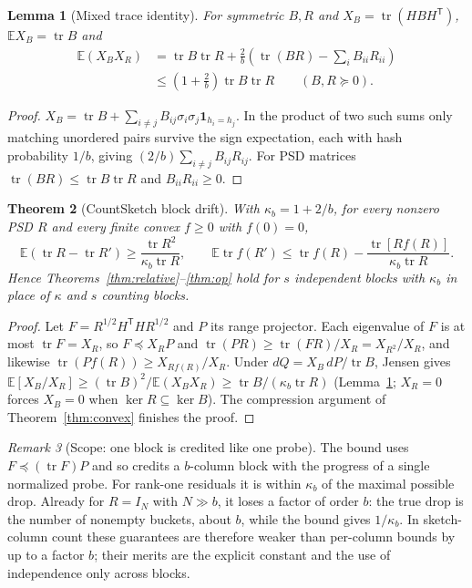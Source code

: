 \documentclass[11pt,a4paper]{article}
\newtheorem{theorem}{Theorem}[section]
\newtheorem{lemma}[theorem]{Lemma}
\theoremstyle{definition}\newtheorem{definition}[theorem]{Definition}
\theoremstyle{remark}\newtheorem{remark}[theorem]{Remark}
\numberwithin{equation}{section}
\newcommand{\E}{\mathbb E}
\newcommand{\tr}{\operatorname{tr}}
\begin{document}
\begin{lemma}[Mixed trace identity]\label{lem:cs}
For symmetric $B,R$ and $X_B=\tr(HBH^{\mathsf T})$,
$\E X_B=\tr B$ and
\[
\begin{aligned}
 \E(X_BX_R)
 &=\tr B\tr R+\frac2b\left(\tr(BR)-\sum_iB_{ii}R_{ii}\right)\\
 &\le\left(1+\frac2b\right)\tr B\tr R
 \qquad(B,R\succeq0).
\end{aligned}
\]
\end{lemma}
\begin{proof}
$X_B=\tr B+\sum_{i\ne j}B_{ij}\sigma_i\sigma_j\mathbf1_{h_i=h_j}$. In the product of two
such sums only matching unordered pairs survive the sign expectation, each with
hash probability $1/b$, giving $(2/b)\sum_{i\ne j}B_{ij}R_{ij}$. For PSD matrices
$\tr(BR)\le\tr B\tr R$ and $B_{ii}R_{ii}\ge0$.
\end{proof}

\begin{theorem}[CountSketch block drift]\label{thm:cs}
With $\kappa_b=1+2/b$, for every nonzero PSD $R$ and every finite convex
$f\ge0$ with $f(0)=0$,
\[
 \E(\tr R-\tr R')\ge\frac{\tr R^2}{\kappa_b\tr R},\qquad
 \E\tr f(R')\le\tr f(R)-\frac{\tr[Rf(R)]}{\kappa_b\tr R}.
\]
Hence Theorems~\ref{thm:relative}--\ref{thm:op} hold for $s$ independent blocks
with $\kappa_b$ in place of $\kappa$ and $s$ counting blocks.
\end{theorem}
\begin{proof}
Let $F=R^{1/2}H^{\mathsf T}HR^{1/2}$ and $P$ its range projector. Each eigenvalue of
$F$ is at most $\tr F=X_R$, so $F\preceq X_RP$ and
$\tr(PR)\ge\tr(FR)/X_R=X_{R^2}/X_R$, and likewise $\tr(Pf(R))\ge X_{Rf(R)}/X_R$.
Under $dQ=X_B\,dP/\tr B$, Jensen gives
$\E[X_B/X_R]\ge(\tr B)^2/\E(X_BX_R)\ge\tr B/(\kappa_b\tr R)$ (Lemma~\ref{lem:cs};
$X_R=0$ forces $X_B=0$ when $\ker R\subseteq\ker B$). The compression argument
of Theorem~\ref{thm:convex} finishes the proof.
\end{proof}

\begin{remark}[Scope: one block is credited like one probe]
The bound uses $F\preceq(\tr F)P$ and so credits a $b$-column block with the
progress of a single normalized probe. For rank-one residuals it is within $\kappa_b$ of the maximal possible drop.
Already for $R=I_N$ with $N\gg b$, it loses a factor of order $b$: the true drop
is the number of nonempty buckets, about $b$, while the bound gives
$1/\kappa_b$. In sketch-column count these guarantees are therefore
weaker than per-column bounds by up to a factor $b$; their merits are the
explicit constant and the use of independence only across blocks.
\end{remark}
\end{document}
